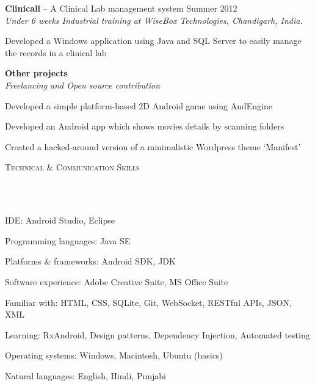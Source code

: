 \documentclass{article}
\newcommand{\header}[1]{{
\hspace*{-15pt}\vspace*{6pt} \textsc{#1}} \vspace*{-6pt} 
\lineunder
}
\newcommand{\lineunder}{
\vspace*{-8pt} \\ \hspace*{-18pt} 
\hrulefill \\
}
\newcommand{\project}[4]{{
\vspace*{2pt}%
\textbf{#1} #2 \hfill #3\\ \textit{#4} \vspace*{2pt}}
}
\renewcommand{\labelitemii}{
$\vcenter{\hbox{\tiny$\bullet$}}$\hspace*{-3pt}
}
\newenvironment{bullet-list-major}{
\begin{list}{\labelitemii}{\setlength\leftmargin{3pt} 
\topsep 0pt \itemsep -2pt}}{\vspace*{4pt}\end{list}
}
\newenvironment{bullet-list-minor}{
\begin{list}{\labelitemii}{\setlength\leftmargin{15pt} 
\topsep 0pt \itemsep -2pt}}{\vspace*{4pt}\end{list}
}
\begin{document}
    \project{Clinicall}{-- A Clinical Lab management system}{Summer 2012}{Under 6 weeks Industrial training at WiseBox Technologies, Chandigarh, India.}
	\begin{bullet-list-minor}
	\item Developed a Windows application using Java and SQL Server to easily manage the records in a clinical lab
	\end{bullet-list-minor}

    \project{Other projects}{}{}{Freelancing and Open source contribution}
	\begin{bullet-list-minor}
	\item Developed a simple platform-based 2D Android game using AndEngine
	\vspace{2pt}
	\item Developed an Android app which shows movies details by scanning folders
	\vspace{2pt}
    \item Created a hacked-around version of a minimalistic Wordpress theme `Manifest'
	\end{bullet-list-minor}
	
\vspace*{4pt}%
\header{Technical \& Communication Skills}
    \begin{bullet-list-major}
    \item IDE: Android Studio, Eclipse
    \vspace{2pt}
    \item Programming languages: Java SE
    \vspace{2pt}
    \item Platforms \& frameworks: Android SDK, JDK
    \vspace{2pt}
    \item Software experience: Adobe Creative Suite, MS Office Suite
    \vspace{2pt}
    \item Familiar with: HTML, CSS, SQLite, Git, WebSocket, RESTful APIs, JSON, XML
    \vspace{2pt}
    \item Learning: RxAndroid, Design patterns, Dependency Injection, Automated testing
    \vspace{2pt}
    \item Operating systems: Windows, Macintosh, Ubuntu (basics)
    \vspace{2pt}
    \item Natural languages: English, Hindi, Punjabi
    \end{bullet-list-major}
\end{document}
